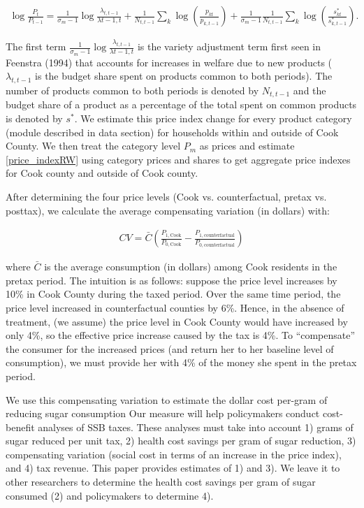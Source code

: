 \documentclass[12pt]{article}
\begin{document}
\begin{align}
    \log \frac{P_t}{P_{t-1}} = \frac{1  }{\sigma_m-1} \log \frac{\lambda_{t,t-1}}{\lambda{t-1,t}} + \frac{1}{N_{t,t-1}} \sum_k \log \left(  \frac{p_{kt}}{p_{k,t-1}}\right) + \frac{1}{\sigma_m -1}\frac{1}{N_{t,t-1}} \sum_k \log\left(\frac{s^*_{kt}}{s^*_{k,t-1}} \right) \label{price_indexRW} .
\end{align}

The first term $\frac{1  }{\sigma_m-1} \log \frac{\lambda_{t,t-1}}{\lambda{t-1,t}}$ is the variety adjustment term first seen in Feenstra (1994) that accounts for increases in welfare due to new products ($\lambda_{t,t-1}$ is the budget share spent on products common to both periods). The number of products common to both periods is denoted by $N_{t,t-1}$ and the budget share of a product as a percentage of the total spent on common products is denoted by $s^*$. We estimate this price index change for every product category (module described in data section) for households within and outside of Cook County. We then treat the category level $P_m$ as prices and estimate \eqref{price_indexRW} using category prices and shares to get aggregate price indexes for Cook county and outside of Cook county.

After determining the four price levels (Cook vs. counterfactual, pretax vs. posttax), we  calculate the average compensating variation (in dollars) with:

\begin{align}
CV = \bar{C}\left(\frac{P_{1,\text{Cook}}}{P_{0,\text{Cook}}} - \frac{P_{1,\text{counterfactual}}}{P_{0,\text{counterfactual}}}\right) \label{cv}
\end{align}

where $\bar{C}$ is the average consumption (in dollars) among Cook residents in the pretax period. The intuition is as follows: suppose the price level increases by 10\% in Cook County during the taxed period. Over the same time period, the price level increased in counterfactual counties by 6\%. Hence, in the absence of treatment, (we assume) the price level in Cook County would have increased by only 4\%, so the effective price increase caused by the tax is 4\%. To ``compensate'' the consumer for the increased prices (and return her to her baseline level of consumption), we must provide her with 4\% of the money she spent in the pretax period.

We  use this compensating variation to estimate the dollar cost per-gram of reducing sugar consumption    Our measure will help policymakers conduct cost-benefit analyses of SSB taxes. These analyses must take into account 1) grams of sugar reduced per unit tax, 2) health cost savings per gram of sugar reduction, 3) compensating variation (social cost in terms of an increase in the price index), and 4) tax revenue. This paper provides estimates of 1) and 3). We leave it to other researchers to determine the health cost savings per gram of sugar consumed (2) and policymakers to determine 4).
\end{document}

